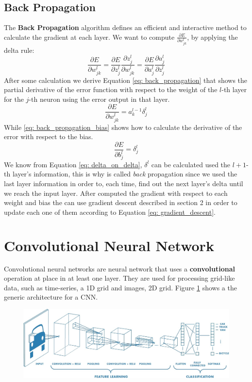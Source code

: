 \documentclass[11pt]{article}
\begin{document}
\subsection{Back Propagation}
The \textbf{Back Propagation} algorithm defines an efficient and interactive method to calculate the gradient at each layer. We want to compute $\frac{\partial E}{\partial w^l_{jk}}$, by applying the delta rule: 
\begin{equation}
\frac{\partial E}{\partial w^l_{jk}} = \frac{\partial E}{\partial z^l_j}\frac{\partial z^l_j}{\partial w^l_{jk}} =	
\frac{\partial E}{\partial a^l_j}\frac{\partial a^l_j}{\partial z^l_{j}}
\end{equation}
After some calculation we derive Equation \ref{eq: back_propagation} that shows the partial derivative of the error function with respect to the weight of the $l$-th layer for the $j$-th neuron using the error output in that layer.
\begin{equation}
\frac{\partial E}{\partial w^l_{jk}} = a^{l-1}_k \delta^l_j
\label{eq: back_propagation}
\end{equation}  
While \ref{eq: back_propagation_bias} shows how to calculate the derivative of the error with respect to the bias.
\begin{equation}
\frac{\partial E}{\partial b^l_j} = \delta^l_j
\label{eq: back_propagation_bias}
\end{equation}
We know from Equation \ref{eq: delta_on_delta}, $\delta^l$ can be calculated used the $l+1$-th layer's information, this is why is called \emph{back} propagation since we used the last layer information in order to, each time, find out the next layer's delta until we reach the input layer.
After computed the gradient with respect to each weight and bias the can use gradient descent described in section 2 in order to update each one of them according to Equation \ref{eq: gradient_descent}.
\section{Convolutional Neural Network}
Convolutional neural networks are neural network that uses a \textbf{convolutional} operation at place in at least one layer. They are used for processing grid-like data, such as time-series, a 1D grid and images, 2D grid. Figure \ref{fig: cnn} shows a the generic architecture for a CNN.
\begin{figure}[H]
\centering
\includegraphics[scale=0.35]{images/cnn}
\caption{}
\label{fig: cnn}	
\end{figure}
\end{document}
